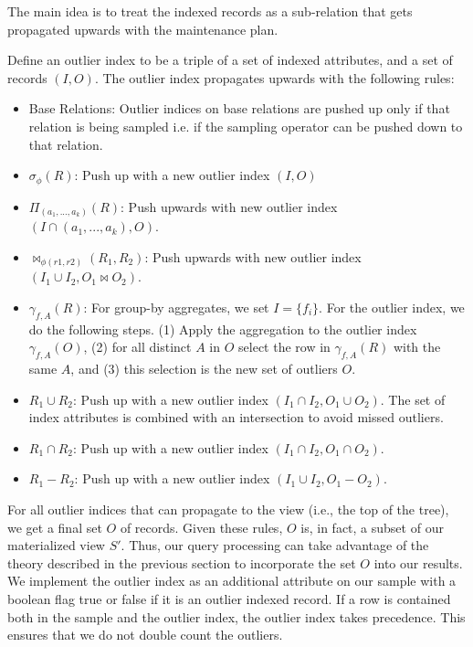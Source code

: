 The main idea is to treat the indexed records as a sub-relation that gets propagated upwards with the maintenance plan.
\begin{definition}
Define an outlier index to be a triple of a set of indexed attributes, and a set of records $(I,O)$. The outlier index propagates upwards with the following rules: 
\begin{itemize}\vspace{-.45em}
\item Base Relations: Outlier indices on base relations are pushed up only if that relation is being sampled i.e. if the sampling operator can be pushed down to that relation.\vspace{-.45em}
\item $\sigma_{\phi}(R)$: Push up with a new outlier index $(I,O)$ \vspace{-.45em}
\item $\Pi_{(a_1,...,a_k)}(R)$: Push upwards with new outlier index $(I \cap (a_1,...,a_k), O)$.\vspace{-.45em}
\item $\bowtie_{\phi (r1,r2)}(R_1,R_2)$: Push upwards with new outlier index $(I_{1} \cup I_{2}, O_1 \bowtie O_2)$. 
\item $\gamma_{f,A}(R)$: For group-by aggregates, we set $I = \{f_i\}$. For the outlier index, we do the following steps. (1) Apply the aggregation to the outlier index $\gamma_{f,A}(O)$, (2) for all distinct $A$ in $O$ select the row in $\gamma_{f,A}(R)$ with the same $A$, and (3) this selection is the new set of outliers $O$. 
\item $R_1 \cup R_2$: Push up with a new outlier index $(I_1 \cap I_2, O_1 \cup O_2)$. The set of index attributes is combined with an intersection to avoid missed outliers.
\item $R_1 \cap R_2$: Push up with a new outlier index $(I_1 \cap I_2, O_1 \cap O_2)$.
\item $R_1 - R_2$: Push up with a new outlier index $(I_1 \cup I_2, O_1 - O_2)$.
\end{itemize}
\end{definition}

For all outlier indices that can propagate to the view (i.e., the top of the tree), we get a final set $O$ of records. 
Given these rules, $O$ is, in fact, a subset of our materialized view $S'$.
Thus, our query processing can take advantage of the theory described in the previous section to incorporate the set $O$ into our results.
We implement the outlier index as an additional attribute on our sample with a boolean flag true or false if it is an outlier indexed record.
If a row is contained both in the sample and the outlier index, the outlier index takes precedence.
This ensures that we do not double count the outliers.

